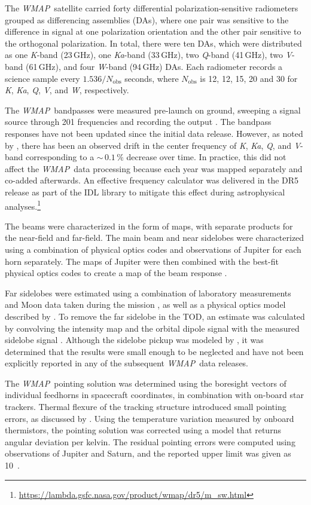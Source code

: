 \documentclass[twocolumn]{../../common/aa}
\def\WMAP{\emph{WMAP}}
\newcommand{\K}[0]{\textit K}
\newcommand{\Ka}[0]{\textit{Ka}}
\newcommand{\Q}[0]{\textit Q}
\newcommand{\V}[0]{\textit V}
\newcommand{\W}[0]{\textit W}
\begin{document}
The \WMAP\ satellite carried forty differential polarization-sensitive
radiometers grouped as differencing assemblies (DAs), where one pair
was sensitive to the difference in signal at one polarization
orientation and the other pair sensitive to the orthogonal
polarization. In total, there were ten DAs, which were distributed as
one \K-band (23\,GHz), one \Ka-band (33\,GHz), two \Q-band (41\,GHz),
two \V-band (61\,GHz), and four \W-band (94\,GHz) DAs. Each radiometer records a science sample every $1.536/N_\mathrm{obs}$ seconds, where $N_\mathrm{obs}$ is 12, 12, 15, 20 and 30 for \K, \Ka, \Q, \V, and \W, respectively.

The \WMAP\ bandpasses were measured pre-launch on ground, sweeping a signal source through 201 frequencies and recording the output \citep{jarosik2003:MAP}. The bandpass responses have not been updated since the initial data release. However, as noted by \citet{bennett2012}, there has been an observed drift in the center frequency of \K, \Ka, \Q, and \V-band corresponding to a $\sim$$\,0.1\,\%$ decrease over time. In practice, this did not affect the \WMAP\ data processing because each year was mapped separately and co-added afterwards. An effective frequency calculator was delivered in the DR5 release as part of the IDL library to mitigate this effect during astrophysical analyses.\footnote{\url{https://lambda.gsfc.nasa.gov/product/wmap/dr5/m_sw.html}}

The beams were characterized in the form of maps, with separate products for the near-field and far-field. The main beam and near sidelobes were characterized using a combination of physical optics codes and observations of Jupiter for each horn separately. The maps of Jupiter were then combined with the best-fit physical optics codes to create a map of the beam response \citep{hill2009,weiland2010,bennett2012}.

Far sidelobes were estimated using a combination of laboratory measurements and Moon data taken during the mission \citep{barnes2003}, as well as a physical optics model described by \citet{hinshaw2009}. To remove the far sidelobe  in the TOD, an estimate was calculated by convolving the intensity map and the orbital dipole signal with the measured sidelobe signal \citep{jarosik2007}. Although the sidelobe pickup was modeled by \citet{barnes2003}, it was determined that the results were small enough to be neglected and have not been explicitly reported in any of the subsequent \WMAP\ data releases.

The \WMAP\ pointing solution was determined using the boresight vectors of individual feedhorns in spacecraft coordinates, in combination with on-board star trackers. Thermal flexure of the tracking structure introduced small pointing errors, as discussed by \citet{jarosik2007}. Using the temperature variation measured by onboard thermistors, the pointing solution was corrected using a model that returns angular deviation per kelvin. The residual pointing errors were computed using observations of Jupiter and Saturn, and the reported upper limit was given as 10\arcsec\ \citep{bennett2012,wmapexsupp}.
\end{document}
